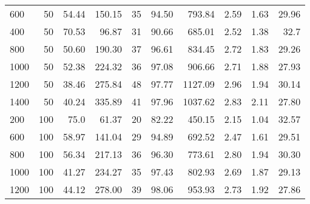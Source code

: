 \begin{table}[H]
{{\begin{tabular}{lrrrrrrrrr}
                600        & 50                   & 54.44             & 150.15          & 35       & 94.50          & 793.84                     & 2.59      & 1.63              & 29.96                    \\
                400        & 50                   & 70.53             & 96.87           & 31       & 90.66          & 685.01                     & 2.52      & 1.38              & 32.7                     \\
                800        & 50                   & 50.60             & 190.30          & 37       & 96.61          & 834.45                     & 2.72      & 1.83              & 29.26                    \\
                1000       & 50                   & 52.38             & 224.32          & 36       & 97.08          & 906.66                     & 2.71      & 1.88              & 27.93                    \\
                1200       & 50                   & 38.46             & 275.84          & 48       & 97.77          & 1127.09                    & 2.96      & 1.94              & 30.14                    \\
                1400       & 50                   & 40.24             & 335.89          & 41       & 97.96          & 1037.62                    & 2.83      & 2.11              & 27.80                    \\
                \hline
                200        & 100                  & 75.0              & 61.37           & 20       & 82.22          & 450.15                     & 2.15      & 1.04              & 32.57                    \\
                600        & 100                  & 58.97             & 141.04          & 29       & 94.89          & 692.52                     & 2.47      & 1.61              & 29.51                    \\
                800        & 100                  & 56.34             & 217.13          & 36       & 96.30          & 773.61                     & 2.80      & 1.94              & 30.30                    \\
                1000       & 100                  & 41.27             & 234.27          & 35       & 97.43          & 802.93                     & 2.69      & 1.87              & 29.13                    \\
                1200       & 100                  & 44.12             & 278.00          & 39       & 98.06          & 953.93                     & 2.73      & 1.92              & 27.86                    \\

\end{tabular}}}
\end{table}

